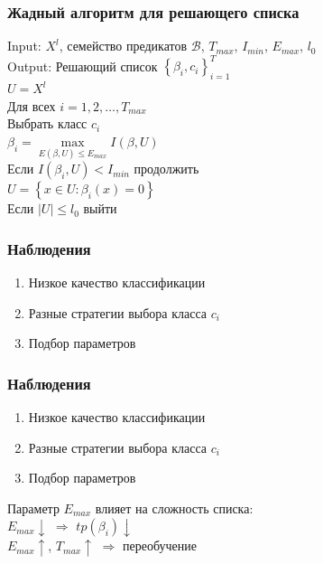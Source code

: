 \documentclass[12pt]{beamer}
\begin{document}
\begin{frame}\frametitle{Жадный алгоритм для решающего списка}
Input: $X^l$, семейство предикатов $\mathcal{B}$, $T_{max}$, $I_{min}$, $E_{max}$, $l_0$\\
Output: Решающий список $\left\{ \beta_i, c_i \right\}_{i=1}^T$\\
\vspace{5mm}
$U = X^l$\\
Для всех $i = 1,2,\dots,T_{max}$\\
\hspace{10mm} Выбрать класс $c_i$\\
\hspace{10mm} $\beta_i = \max\limits_{E(\beta, U) \leq E_{max}} I(\beta, U)$\\
\hspace{10mm} Если $I(\beta_i, U) < I_{min}$ продолжить\\
\hspace{10mm} $U = \left\{ x \in U: \beta_i(x) = 0 \right\}$\\
\hspace{10mm} Если $\vert U \vert \leq l_0$ выйти
\end{frame}

\begin{frame}\frametitle{Наблюдения}
\begin{enumerate}[--]
\item Низкое качество классификации
\item Разные стратегии выбора класса $c_i$
\item Подбор параметров
\end{enumerate}
\end{frame}

\begin{frame}\frametitle{Наблюдения}
\begin{enumerate}[--]
\item Низкое качество классификации
\item Разные стратегии выбора класса $c_i$
\item Подбор параметров
\end{enumerate}
\vspace{5mm}
Параметр $E_{max}$ влияет на сложность списка:\\
$E_{max} \downarrow$ $\Rightarrow$ $tp(\beta_i) \downarrow$\\
$E_{max} \uparrow$, $T_{max} \uparrow$ $\Rightarrow$ переобучение
\end{frame}
\end{document}
